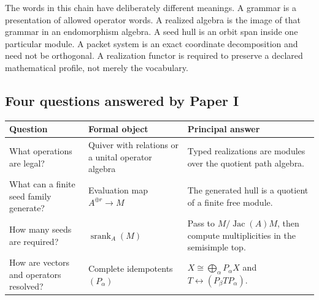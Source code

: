 \documentclass[11pt]{article}
\theoremstyle{definition}
\theoremstyle{remark}
\newcommand{\srank}{\operatorname{srank}}
\newcommand{\Jac}{\operatorname{Jac}}
\begin{document}
The words in this chain have deliberately different meanings.  A grammar is a presentation of allowed operator words.  A realized algebra is the image of that grammar in an endomorphism algebra.  A seed hull is an orbit span inside one particular module.  A packet system is an exact coordinate decomposition and need not be orthogonal.  A realization functor is required to preserve a declared mathematical profile, not merely the vocabulary.

\subsection*{Four questions answered by Paper I}
\begin{center}
\begin{tabularx}{0.96\textwidth}{@{}>{\raggedright\arraybackslash}p{}Y Y@{}}
\toprule
\textbf{Question} & \textbf{Formal object} & \textbf{Principal answer}\\
\midrule
What operations are legal? & Quiver with relations or a unital operator algebra & Typed realizations are modules over the quotient path algebra.\\
What can a finite seed family generate? & Evaluation map \(A^{\oplus r}\to M\) & The generated hull is a quotient of a finite free module.\\
How many seeds are required? & \(\srank_A(M)\) & Pass to \(M/\Jac(A)M\), then compute multiplicities in the semisimple top.\\
How are vectors and operators resolved? & Complete idempotents \((P_\alpha)\) & \(X\cong\bigoplus_\alpha P_\alpha X\) and \(T\leftrightarrow(P_\beta TP_\alpha)\).\\
\bottomrule
\end{tabularx}
\end{center}
\end{document}
